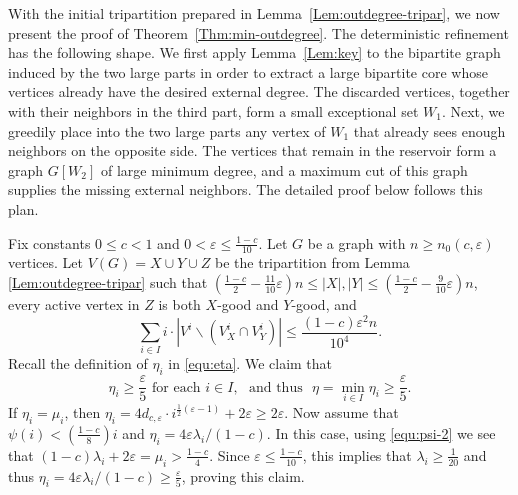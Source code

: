 \documentclass{aic}
\begin{document}
	With the initial tripartition prepared in Lemma~\ref{Lem:outdegree-tripar},
	we now present the proof of Theorem~\ref{Thm:min-outdegree}.
	The deterministic refinement has the following shape.
	We first apply Lemma~\ref{Lem:key} to the bipartite graph induced by the two large parts in order to extract a large bipartite core whose vertices already have the desired external degree.
	The discarded vertices, together with their neighbors in the third part, form a small exceptional set $W_1$.
	Next, we greedily place into the two large parts any vertex of $W_1$ that already sees enough neighbors on the opposite side.
	The vertices that remain in the reservoir form a graph $G[W_2]$ of large minimum degree, and a maximum cut of this graph supplies the missing external neighbors.
	The detailed proof below follows this plan.
	
	\medskip
	
	Fix constants $0\leq c<1$ and $0<\varepsilon\leq \frac{1-c}{10}.$
	Let $G$ be a graph with $n\geq n_0(c,\varepsilon)$ vertices.
	Let $V(G)=X\cup Y\cup Z$ be the tripartition from Lemma \ref{Lem:outdegree-tripar} such that
	$(\frac{1-c}{2}-\frac{11}{10}\varepsilon)n\leq |X|,|Y|\leq (\frac{1-c}{2}-\frac{9}{10}\varepsilon)n$,
	every active vertex in $Z$ is both  $X$-good and $Y$-good, and
	\begin{equation}\label{equ:outdeg 2}
		\sum_{i\in I} i\cdot |V^i\backslash (V^i_X\cap V^i_Y)|\leq \frac{(1-c)\varepsilon^2n}{10^4}.
	\end{equation}
	Recall the definition of $\eta_i$ in \eqref{equ:eta}.
	We claim that
	\begin{equation}\label{equ:outdeg delta}
		\eta_i\geq \frac{\varepsilon}{5} \mbox{ for each } i\in I, \mbox{~ and thus ~} \eta=\min_{i\in I} \eta_i\geq \frac{\varepsilon}{5}.
	\end{equation}
	If $\eta_i=\mu_i$, then $\eta_i=4d_{c,\varepsilon}\cdot i^{\frac{1}{2}(\varepsilon-1)}+2\varepsilon\geq 2\varepsilon$.
	Now assume that $\psi(i)< \left(\frac{1-c}{8}\right)i$ and $\eta_i=4\varepsilon\lambda_i/(1-c)$.
	In this case, using \eqref{equ:psi-2} we see that $(1-c)\lambda_i+2\varepsilon=\mu_i>\frac{1-c}{4}$.
	Since $\varepsilon\leq \frac{1-c}{10}$, this implies that $\lambda_i\geq \frac{1}{20}$ and thus
	$\eta_i=4\varepsilon\lambda_i/(1-c)\geq \frac{\varepsilon}{5}$, proving this claim.
	
\end{document}
